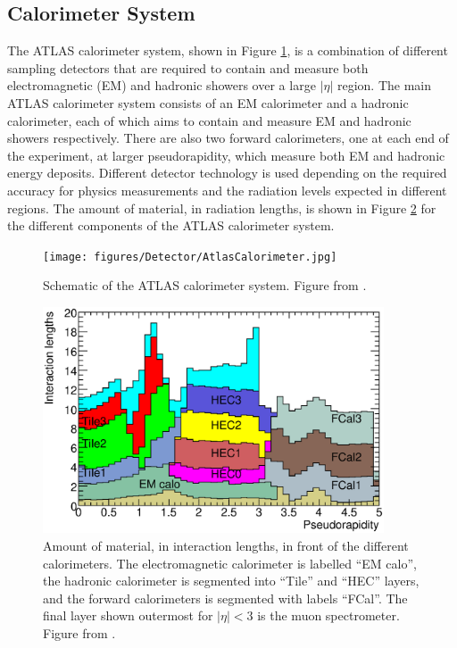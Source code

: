 \subsection{Calorimeter System}
\label{sec:Det:Calo}

The ATLAS calorimeter system, shown in Figure \ref{Det:ATLASCalo}, is a combination of different sampling detectors that are required to contain and measure both electromagnetic (EM) and hadronic showers over a large $|\eta|$ region. 
The main ATLAS calorimeter system consists of an EM calorimeter and a hadronic calorimeter, each of which aims to contain and measure EM and hadronic showers respectively. 
There are also two forward calorimeters, one at each end of the experiment, at larger pseudorapidity, which measure both EM and hadronic energy deposits.
Different detector technology is used depending on the required accuracy for physics measurements and the radiation levels expected in different regions.
The amount of material, in radiation lengths, is shown in Figure \ref{Det:RadLegnth} for the different components of the ATLAS calorimeter system. 


\begin{figure}
  \centering
  \texttt{[image: figures/Detector/AtlasCalorimeter.jpg]}
\caption[ATLAS calorimeter system]{
Schematic of the ATLAS calorimeter system.
Figure from \cite{ref:ATLASExp}.
\label{Det:ATLASCalo}
}
\end{figure}

\begin{figure}
  \centering
  \includegraphics[width=0.9\textwidth]{figures/Detector/CalorimeterRadLegnths.eps}
  \caption[Radiation Lengths of Calorimeter Sub-detectors ]{
Amount of material, in interaction lengths, in front of the different calorimeters.
The electromagnetic calorimeter is labelled ``EM calo'', the hadronic calorimeter is segmented into ``Tile'' and ``HEC'' layers, and the forward calorimeters is segmented with labels ``FCal''.
The final layer shown outermost for $|\eta|<3$ is the muon spectrometer.
Figure from \cite{ref:ATLASExp}.
\label{Det:RadLegnth}
}
\end{figure}





